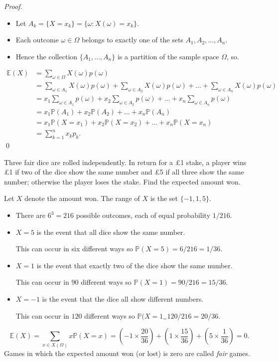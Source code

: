 \documentclass[lecture]{csm}
\newcommand{\prob}{\mathbb{P}}
\newcommand{\expe}{\mathbb{E}}
\def\it{\item}
\def\bit{\begin{itemize}}
\def\eit{\end{itemize}}
\begin{document}
\begin{proof}
\bit
\it Let $A_k = \{X=x_k\} = \{\omega: X(\omega) = x_k\}$.
\it Each outcome $\omega\in\Omega$ belongs to exactly one of the sets $A_1,A_2,\ldots,A_n$.
\it Hence the collection $\{A_1,\ldots,A_n\}$ is a partition of the sample space $\Omega$, so.
\eit
\begin{align*}
\expe(X) 
	& = \sum_{\omega\in\Omega} X(\omega)p(\omega) \\
	& = \sum_{\omega\in A_1} X(\omega)p(\omega) + \sum_{\omega\in A_2} X(\omega)p(\omega) + \ldots + \sum_{\omega\in A_n} X(\omega)p(\omega) \\
	& = x_1\sum_{\omega\in A_1}p(\omega) + x_2\sum_{\omega\in A_2} p(\omega) + \ldots + x_n\sum_{\omega\in A_n} p(\omega) \\
	& = x_1\prob(A_1) + x_2\prob(A_2) + \ldots + x_n\prob(A_n) \\[1ex]
	& = x_1\prob(X=x_1) + x_2\prob(X=x_2) + \ldots + x_n\prob(X=x_n) \\
	& = \sum_{k=1}^n x_kp_k.
\end{align*}
\qed
\end{proof}

\break %

\begin{example}
Three fair dice are rolled independently. In return for a \pounds 1 stake, a player wins \pounds 1 if two of the dice show the same number and \pounds 5 if all three show the same number; otherwise the player loses the stake. Find the expected amount won.
\begin{solution}
Let $X$ denote the amount won. The range of $X$ is the set $\{-1,1,5\}$.
\bit
\it There are $6^3 = 216$ possible outcomes, each of equal probability $1/216$.
\it $X=5$ is the event that all dice show the same number.
\par This can occur in six different ways so $\prob(X=5) = 6/216 = 1/36$.
\it $X=1$ is the event that exactly two of the dice show the same number.
\par This can occur in $90$ different ways so $\prob(X=1) = 90/216 = 15/36$.
\it $X=-1$ is the event that the dice all show different numbers.
\par This can occur in $120$ different ways so $\prob(X=1_ = 120/216 = 20/36.$
\eit
\[
\expe(X) = \sum_{x\in X(\Omega)} x\prob(X=x)
	= \left(-1\times\frac{20}{36}\right) +\left(1\times\frac{15}{36}\right) +\left(5\times\frac{1}{36}\right) 
	= 0.
\]
Games in which the expected amount won (or lost) is zero are called \emph{fair} games.
\end{solution}
\end{example}
\end{document}
